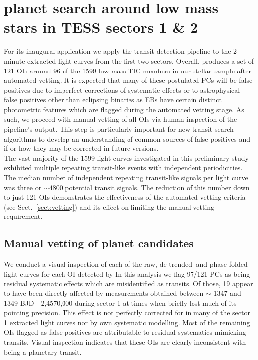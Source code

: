 \section{\pipeline{} planet search around low mass stars in TESS sectors 1 \& 2} \label{sect:search}
For its inaugural application we apply the \pipeline{} transit detection pipeline to the
2 minute extracted light curves from the first two \tess{} sectors. 
Overall, \pipeline{} produces a set of 121 OIs around 96 of the 1599 low mass TIC members in our stellar
sample after automated vetting.
It is expected that many of these postulated PCs will be false positives due to
imperfect corrections of systematic effects or to astrophysical false positives other than eclipsing
binaries as EBs have certain distinct photometric features which are flagged during the automated 
vetting stage. As such, we proceed with manual vetting of all \pipeline{} OIs via human inspection
of the pipeline's output. This step is particularly important for new transit
search algorithms to develop an understanding of common sources of false positives and if or how
they may be corrected in future versions. \\

The vast majority of the 1599 light curves investigated in this preliminary study exhibited
multiple repeating transit-like events with independent periodicities. The median number of independent
repeating transit-like signals per light curve was three or $\sim 4800$ potential transit signals.
The reduction of this number down to just 121 OIs demonstrates the effectiveness of the \pipeline{}
automated vetting criteria (see Sect.~\ref{sect:vetting}) and its effect on limiting the 
manual vetting requirement.


\subsection{Manual vetting of \pipeline{} planet candidates} \label{sect:manual}
We conduct a visual inspection of each of the raw, de-trended, and phase-folded light curves for
each OI detected by  
In this analysis we flag 97/121 PCs as being residual systematic effects which are
misidentified as transits. Of those, 19 appear to have been directly affected by measurements
obtained between $\sim$ 1347 and 1349 BJD - 2,4570,000 during sector 1 at times when \tess{} briefly lost much
of its pointing precision. This effect is not perfectly corrected for in many of the sector 1 extracted light
curves nor by  own systematic modelling. Most of the remaining OIs flagged as false positives are attributable
to residual systematics mimicking transits. Visual inspection indicates that these OIs are clearly
inconsistent with being a planetary transit. \\

